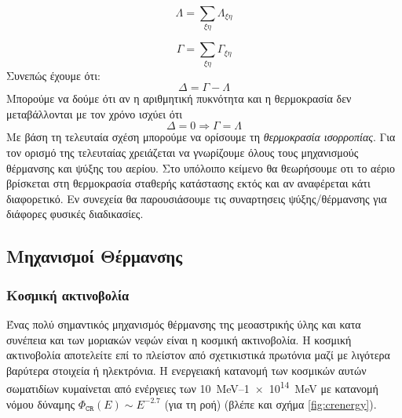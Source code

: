\begin{equation}
\Lambda = \sum_{\xi \eta}\Lambda_{\xi \eta}
\label{thermFunction}
\end{equation}

\begin{equation}
\Gamma = \sum_{\xi \eta}\Gamma_{\xi \eta}
\end{equation}
Συνεπώς έχουμε ότι:
\begin{equation}
\Delta = \Gamma -\Lambda
\end{equation}
Μπορούμε να δούμε ότι αν η αριθμητική πυκνότητα και η θερμοκρασία δεν μεταβάλλονται με τον χρόνο ισχύει ότι 
\begin{equation}
\Delta = 0 \Rightarrow \Gamma = \Lambda 
\end{equation}
Με βάση τη τελευταία σχέση μπορούμε να ορίσουμε τη \emph{θερμοκρασία ισορροπίας}. Για τον ορισμό της τελευταίας χρειάζεται να γνωρίζουμε όλους τους μηχανισμούς θέρμανσης και ψύξης του αερίου. Στο υπόλοιπο κείμενο θα θεωρήσουμε οτι το αέριο βρίσκεται στη θερμοκρασία σταθερής κατάστασης εκτός και αν αναφέρεται κάτι διαφορετικό. Εν συνεχεία θα παρουσιάσουμε τις συναρτησεις ψύξης/θέρμανσης για διάφορες φυσικές διαδικασίες.

\subsection{Μηχανισμοί Θέρμανσης}
\subsubsection{Κοσμική ακτινοβολία}
Ένας πολύ σημαντικός μηχανισμός θέρμανσης της μεοαστρικής ύλης και κατα συνέπεια και των μοριακών νεφών είναι η κοσμική ακτινοβολία. Η κοσμική ακτινοβολία αποτελείτε επί το πλείστον από σχετικιστικά πρωτόνια μαζί με λιγότερα βαρύτερα στοιχεία ή ηλεκτρόνια. Η ενεργειακή κατανομή των κοσμικών αυτών σωματιδίων κυμαίνεται από ενέργειες των \SIrange{10}{1e14}{MeV} με κατανομή νόμου δύναμης $\Phi _\mathtt{CR}(E)\sim E^{-2.7}$ (για τη ροή) (βλέπε και σχήμα \ref{fig:crenergy}).


